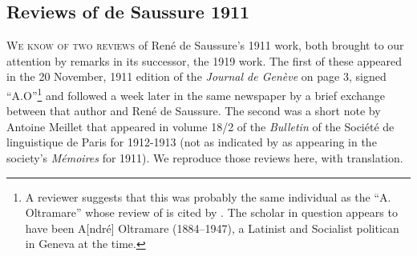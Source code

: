 \begin{appendices}
\chapter*{Reviews of de Saussure 1911}

\lettrine[loversize=0.1, nindent=0.25em]{W}{e know of two reviews} of
René de Saussure's 1911 work, both brought to our attention by remarks
in its successor, the 1919 work. The first of these appeared in the 20
November, 1911 edition of the \textsl{Journal de Genève} on page 3,
signed ``A.O''\footnote{A reviewer suggests that this was probably the
  same individual as the ``A. Oltramare'' whose review of
  \citet{saussure16:cours-original} is cited by
  .  The
  scholar in question appears to have been A[ndré] Oltramare
  (1884--1947), a Latinist and Socialist politican in Geneva at the
  time.} and followed a week later in the same newspaper by a brief
exchange between that author and René de Saussure.  The second was a
short note by Antoine Meillet that appeared in volume 18/2 of the
\textsl{Bulletin} of the Société de linguistique de Paris for
1912-1913 (not as indicated by
 as appearing in the
society's \textsl{Mémoires} for 1911). We reproduce those reviews
here, with translation.

\end{appendices}
